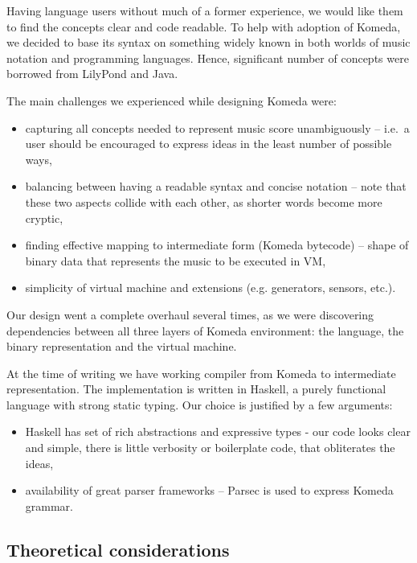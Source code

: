 \documentclass{article}
\begin{document}
Having language users without much of a former experience, we would like them to find the concepts clear and code readable. To help with adoption of Komeda, we decided to base its syntax on something widely known in both worlds of music notation and programming languages. Hence, significant number of concepts were borrowed from LilyPond \cite{lily} and Java. 

The main challenges we experienced while designing Komeda were:
\begin{itemize}
  \item capturing all concepts needed to represent music score unambiguously --
    i.e.~a user should be encouraged to express ideas in the least number of
    possible ways,
  \item balancing between having a readable syntax and concise notation -- note
    that these two aspects collide with each other, as shorter words become
    more cryptic,
  \item finding effective mapping to intermediate form (Komeda bytecode) --
    shape of binary data that represents the music to be executed in VM,
  \item simplicity of virtual machine and extensions (e.g. generators, sensors,
    etc.).
\end{itemize}

Our design went a complete overhaul several times, as we were discovering
dependencies between all three layers of Komeda environment: the language, the
binary representation and the virtual machine.

At the time of writing we have working compiler from Komeda to intermediate
representation. The implementation is written in Haskell, a purely functional
language with strong static typing. Our choice is justified by a few arguments:

\begin{itemize}
  \item Haskell \cite{haskell} has set of rich abstractions and expressive
    types - our code looks clear and simple, there is little verbosity or
    boilerplate code, that obliterates the ideas,
  \item availability of great parser frameworks -- Parsec \cite{parsec} is used
    to express Komeda grammar.
\end{itemize}

\subsection{Theoretical considerations}
\label{lang:theory}
\end{document}
